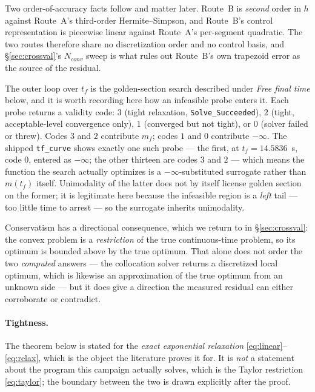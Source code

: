\documentclass[11pt]{article}
\begin{document}
Two order-of-accuracy facts follow and matter later. Route~B is
\emph{second} order in $h$ against Route~A's third-order Hermite--Simpson,
and Route~B's control representation is piecewise linear against Route~A's
per-segment quadratic. The two routes therefore share no discretization
order and no control basis, and \S\ref{sec:crossval}'s $N_{conv}$ sweep is
what rules out Route~B's own trapezoid error as the source of the residual.

The outer loop over $t_f$ is the golden-section search described under
\emph{Free final time} below, and it is worth recording here how an
infeasible probe enters it. Each probe returns a validity code: $3$ (tight
relaxation, \texttt{Solve\_Succeeded}), $2$ (tight, acceptable-level
convergence only), $1$ (converged but not tight), or $0$ (solver failed or
threw). Codes $3$ and $2$ contribute $m_f$; codes $1$ and $0$ contribute
$-\infty$. The shipped \texttt{tf\_curve} shows exactly one such probe --- the
first, at $t_f = 14.5836$~s, code $0$, entered as $-\infty$; the other
thirteen are codes $3$ and $2$ --- which means the function the search actually
optimizes is a $-\infty$-substituted surrogate rather than $m(t_f)$ itself.
Unimodality of the latter does not by itself license golden section on the
former; it is legitimate here because the infeasible region is a \emph{left}
tail --- too little time to arrest --- so the surrogate inherits
unimodality.

Conservatism has a directional consequence, which we return to in
\S\ref{sec:crossval}: the convex problem is a \emph{restriction} of the
true continuous-time problem, so its optimum is bounded above by the true
optimum. That alone does not order the two \emph{computed} answers --- the
collocation solver returns a discretized local optimum, which is likewise
an approximation of the true optimum from an unknown side --- but it does
give a direction the measured residual can either corroborate or
contradict.

\paragraph{Tightness.}

The theorem below is stated for the \emph{exact exponential relaxation}
\eqref{eq:linear}--\eqref{eq:relax}, which is the object the literature
proves it for. It is \emph{not} a statement about the program this campaign
actually solves, which is the Taylor restriction \eqref{eq:taylor}; the
boundary between the two is drawn explicitly after the proof.
\end{document}

